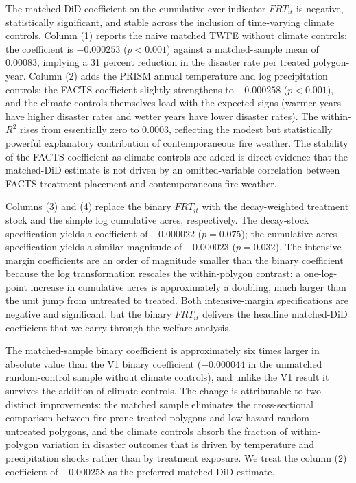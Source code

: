 \documentclass[12pt, letterpaper]{article}
\begin{document}
The matched DiD coefficient on the cumulative-ever indicator $FRT_{it}$ is negative, statistically significant, and stable across the inclusion of time-varying climate controls. Column (1) reports the naive matched TWFE without climate controls: the coefficient is $-0.000253$ ($p < 0.001$) against a matched-sample mean of $0.00083$, implying a 31 percent reduction in the disaster rate per treated polygon-year. Column (2) adds the PRISM annual temperature and log precipitation controls: the FACTS coefficient slightly strengthens to $-0.000258$ ($p < 0.001$), and the climate controls themselves load with the expected signs (warmer years have higher disaster rates and wetter years have lower disaster rates). The within-$R^2$ rises from essentially zero to $0.0003$, reflecting the modest but statistically powerful explanatory contribution of contemporaneous fire weather. The stability of the FACTS coefficient as climate controls are added is direct evidence that the matched-DiD estimate is not driven by an omitted-variable correlation between FACTS treatment placement and contemporaneous fire weather.

Columns (3) and (4) replace the binary $FRT_{it}$ with the decay-weighted treatment stock and the simple log cumulative acres, respectively. The decay-stock specification yields a coefficient of $-0.000022$ ($p = 0.075$); the cumulative-acres specification yields a similar magnitude of $-0.000023$ ($p = 0.032$). The intensive-margin coefficients are an order of magnitude smaller than the binary coefficient because the log transformation rescales the within-polygon contrast: a one-log-point increase in cumulative acres is approximately a doubling, much larger than the unit jump from untreated to treated. Both intensive-margin specifications are negative and significant, but the binary $FRT_{it}$ delivers the headline matched-DiD coefficient that we carry through the welfare analysis.

The matched-sample binary coefficient is approximately six times larger in absolute value than the V1 binary coefficient ($-0.000044$ in the unmatched random-control sample without climate controls), and unlike the V1 result it survives the addition of climate controls. The change is attributable to two distinct improvements: the matched sample eliminates the cross-sectional comparison between fire-prone treated polygons and low-hazard random untreated polygons, and the climate controls absorb the fraction of within-polygon variation in disaster outcomes that is driven by temperature and precipitation shocks rather than by treatment exposure. We treat the column (2) coefficient of $-0.000258$ as the preferred matched-DiD estimate.
\end{document}

